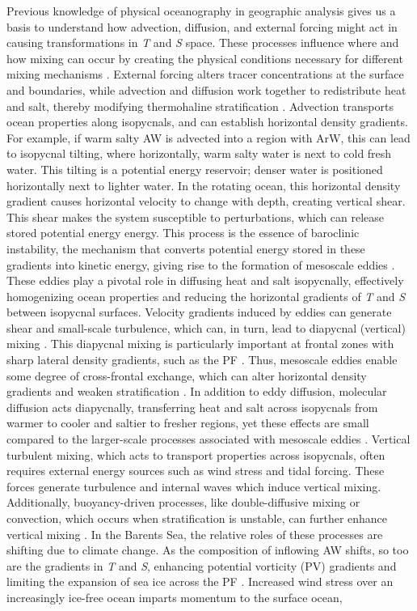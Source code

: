 \documentclass[draft]{agujournal2019}
\begin{document}
Previous knowledge of physical oceanography in geographic analysis gives us a basis to understand how advection, diffusion, and external forcing might act in causing transformations in \emph{T} and \emph{S} space. These processes influence where and how mixing can occur by creating the physical conditions necessary for different mixing mechanisms \cite{StoleHansen1991,Speer1993,long2017}. External forcing alters tracer concentrations at the surface and boundaries, while advection and diffusion work together to redistribute heat and salt, thereby modifying thermohaline stratification \cite{Munk1966}. Advection transports ocean properties along isopycnals, and can establish horizontal density gradients. For example, if warm salty AW is advected into a region with ArW, this can lead to isopycnal tilting, where horizontally, warm salty water is next to cold fresh water. This tilting is a potential energy reservoir; denser water is positioned horizontally next to lighter water. In the rotating ocean, this horizontal density gradient causes horizontal velocity to change with depth, creating vertical shear. This shear makes the system susceptible to perturbations, which can release stored potential energy energy. This process is the essence of baroclinic instability, the mechanism that converts potential energy stored in these gradients into kinetic energy, giving rise to the formation of mesoscale eddies \cite{Vallis2006}. These eddies play a pivotal role in diffusing heat and salt isopycnally, effectively homogenizing ocean properties and reducing the horizontal gradients of \emph{T} and \emph{S} between isopycnal surfaces. Velocity gradients induced by eddies can generate shear and small-scale turbulence, which can, in turn, lead to diapycnal (vertical) mixing \cite{Vallis2006}. This diapycnal mixing is particularly important at frontal zones with sharp lateral density gradients, such as the PF \cite{Oziel2016}. Thus, mesoscale eddies enable some degree of cross-frontal exchange, which can alter horizontal density gradients and weaken stratification \cite{kolas2024}. In addition to eddy diffusion, molecular diffusion acts diapycnally, transferring heat and salt across isopycnals from warmer to cooler and saltier to fresher regions, yet these effects are small compared to the larger-scale processes associated with mesoscale eddies \cite{Kagan2015}. Vertical turbulent mixing, which acts to transport properties across isopycnals, often requires external energy sources such as wind stress and tidal forcing. These forces generate turbulence and internal waves which induce vertical mixing. Additionally, buoyancy-driven processes, like double-diffusive mixing or convection, which occurs when stratification is unstable, can further enhance vertical mixing \cite{Vallis2006}. In the Barents Sea, the relative roles of these processes are shifting due to climate change. As the composition of inflowing AW shifts, so too are the gradients in \emph{T} and \emph{S}, enhancing potential vorticity (PV) gradients and limiting the expansion of sea ice across the PF \cite{Oziel2016,Barton18}. Increased wind stress over an increasingly ice-free ocean imparts momentum to the surface ocean, 
\end{document}
